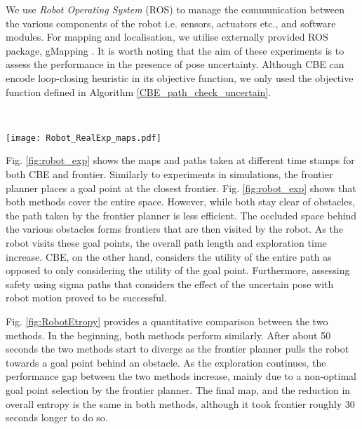 \documentclass[shortAfour,sageh,times]{sagej_no_sage}
\begin{document}
We use \textit{Robot Operating System} (ROS) \citep{quigley2009ros} to manage the communication between the various components of the robot i.e. sensors, actuators etc., and software modules. For mapping and localisation, we utilise externally provided ROS package, gMapping \citep{Grisetti2007}. It is worth noting that the aim of these experiments is to assess the performance in the presence of pose uncertainty. Although CBE can encode loop-closing heuristic in its objective function, we only used the objective function defined in Algorithm \ref{CBE_path_check_uncertain}.

~\begin{figure*}[]
  	
  	\centering
  	
  	\texttt{[image: Robot\_RealExp\_maps.pdf]}
  	
  	\caption{Map building comparison in a real environment. Each image represents the available map at a specific time stamp shown on the left. The frontier method produces a map less efficiently as it chooses unnecessary long paths due to frontiers forming in occluded space behind the various obstacles.}
  	\label{fig:robot_exp}
  \end{figure*}
Fig. \ref{fig:robot_exp} shows the maps and paths taken at different time stamps for both CBE and frontier. Similarly to experiments in simulations, the frontier planner places a goal point at the closest frontier. Fig. \ref{fig:robot_exp} shows that both methods cover the entire space. However, while both stay clear of obstacles, the path taken by the frontier planner is less efficient. The occluded space behind the various obstacles forms frontiers that are then visited by the robot. As the robot visits these goal points, the overall path length and exploration time increase. CBE, on the other hand, considers the utility of the entire path as opposed to only considering the utility of the goal point. Furthermore, assessing safety using sigma paths that considers the effect of the uncertain pose with robot motion proved to be successful.

Fig. \ref{fig:RobotEtropy} provides a quantitative comparison between the two methods. In the beginning, both methods perform similarly. After about 50 seconds the two methods start to diverge as the frontier planner pulls the robot towards a goal point behind an obstacle. As the exploration continues, the performance gap between the two methods increase, mainly due to a non-optimal goal point selection by the frontier planner. The final map, and the reduction in overall entropy is the same in both methods, although it took frontier roughly 30 seconds longer to do so. 
\end{document}
